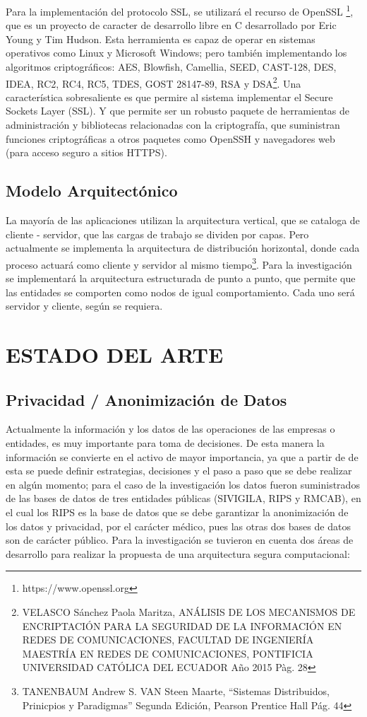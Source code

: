 \documentclass[a4paper,openright,12pt]{book}
\theoremstyle{definition}
\theoremstyle{remark}
\begin{document}
Para la implementación del protocolo SSL, se utilizará el recurso de OpenSSL \footnote{https://www.openssl.org}, que es un proyecto de caracter de desarrollo libre en C desarrollado por Eric Young y Tim Hudson. Esta herramienta es capaz de operar en sistemas operativos como Linux y
Microsoft Windows; pero también implementando los algoritmos criptográficos: AES, Blowfish, Camellia, SEED, CAST-128, DES, IDEA, RC2, RC4, RC5, TDES, GOST 28147-89, RSA y DSA\footnote{
VELASCO Sánchez Paola Maritza, ANÁLISIS DE LOS MECANISMOS DE ENCRIPTACIÓN PARA LA SEGURIDAD DE LA
INFORMACIÓN EN REDES DE COMUNICACIONES, FACULTAD DE INGENIERÍA MAESTRÍA EN REDES DE COMUNICACIONES, PONTIFICIA UNIVERSIDAD CATÓLICA DEL ECUADOR Año 2015 Pàg. 28}. Una característica sobresaliente es que permire al sistema implementar el Secure Sockets Layer (SSL). Y que permite ser un robusto paquete de herramientas de administración y bibliotecas relacionadas con la criptografía, que suministran funciones criptográficas a otros paquetes como OpenSSH y navegadores web (para acceso seguro a sitios HTTPS).
    \subsection{Modelo Arquitectónico}
La mayoría de las aplicaciones utilizan la arquitectura vertical, que se cataloga de cliente - servidor, que las cargas de trabajo se dividen por capas. Pero actualmente se implementa la arquitectura de distribución horizontal, donde cada proceso actuará como cliente y servidor al mismo tiempo\footnote{TANENBAUM Andrew S. VAN Steen Maarte,  “Sistemas Distribuidos, Prinicpios y Paradigmas” Segunda Edición, Pearson Prentice Hall Pág. 44}. Para la investigación se implementará la arquitectura estructurada de punto a punto, que permite que las entidades se comporten como nodos de igual comportamiento. Cada uno será servidor y cliente, según se requiera.
\section{ESTADO DEL ARTE}
	\subsection{Privacidad / Anonimización de Datos}
Actualmente la información y los datos de las operaciones de las empresas o entidades, es muy importante para toma de decisiones. De esta manera la información se convierte en el activo de mayor importancia, ya que a partir de de esta se puede definir estrategias, decisiones y el paso a paso que se debe realizar en algún momento; para el caso de la investigación los datos fueron suministrados de las bases de datos de tres entidades públicas (SIVIGILA, RIPS y RMCAB), en el cual los RIPS es la base de datos que se debe garantizar la anonimización de los datos y privacidad, por el carácter médico, pues las otras dos bases de datos son de carácter público. Para la investigación se tuvieron en cuenta dos áreas de desarrollo para realizar la propuesta de una arquitectura segura computacional:
\end{document}
